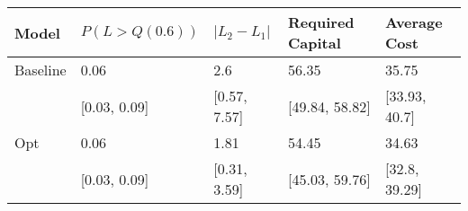 \begin{tabular}{lllll}
\toprule
    Model & $P(L > Q(0.6))$ & $|L_2 - L_1|$ & Required Capital &   Average Cost \\
\midrule
 Baseline &            0.06 &           2.6 &            56.35 &          35.75 \\
          &    [0.03, 0.09] &  [0.57, 7.57] &   [49.84, 58.82] &  [33.93, 40.7] \\
      Opt &            0.06 &          1.81 &            54.45 &          34.63 \\
          &    [0.03, 0.09] &  [0.31, 3.59] &   [45.03, 59.76] &  [32.8, 39.29] \\
\bottomrule
\end{tabular}
